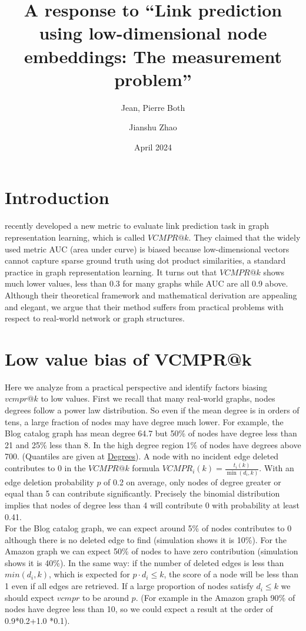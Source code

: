 \documentclass{article}
\title{A response to “Link prediction using low-dimensional node embeddings:
The measurement problem”}
\author[1,*]{Jean, Pierre Both}
\author[2]{Jianshu Zhao}
\affil[1]{Université Paris-Saclay, CEA, List, Palaiseau, France. (Retired)}
\affil[2]{Center for Bioinformatics and Computational Genomics, Georgia Institute of Technology, Atlanta, Georgia, USA}
\affil[*]{Corresponding author : jeanpierre.both@gmail.com}
\date{April 2024}
\begin{document}
\maketitle

\section{Introduction}

\citet{Menand} recently developed a new metric to evaluate link prediction task in graph representation learning, which is called $VCMPR@k$.
They claimed that the widely used metric AUC (area under curve) is biased because low-dimensional vectors cannot capture sparse ground truth using dot product similarities, a standard practice in graph representation learning.
It turns out that $VCMPR@k$ shows much lower values, less than 0.3 for many graphs while AUC are all 0.9 above. Although their theoretical framework and mathematical derivation are appealing and elegant, we argue that their method suffers from practical problems with respect to real-world network or graph structures.


\section{Low value bias of VCMPR@k}

Here we analyze from a practical perspective and identify factors biasing $vcmpr@k$ to low values.
First we recall that many real-world graphs, nodes degrees follow a power law distribution.
So even if the mean degree is in orders of tens, a large fraction of nodes may have degree much lower.
For example, the Blog catalog graph has mean degree 64.7 but 50\% of nodes have degree less than 21 and 25\% less than 8. In the high degree region 1\% of nodes have degrees above 700. (Quantiles are given at  \href{https://github.com/jean-pierreBoth/linkauc/tree/master/Degrees}{\color{blue}Degrees}).
A node with no incident edge deleted contributes to 0 in the $VCMPR@k$ formula $ VCMPR_{i}(k)= \frac{t_{i}(k)}{\min(d_{i},k)}$. With an edge deletion probability $p$ of 0.2 on average, only nodes of degree greater or equal than 5 can contribute significantly. Precisely the binomial distribution implies that nodes of degree less than 4 will contribute 0 with probability at least 0.41. \\
For the Blog catalog graph, we can expect around 5\% of nodes contributes to 0 although there is no deleted edge to find (simulation shows it is 10\%).
For the Amazon graph we can expect 50\% of nodes to have zero contribution (simulation shows it is 40\%).
In the same way: if the number of deleted edges is less than $min(d_{i},k)$, which is expected for $p \cdot d_{i} \leq k$, the score of a node will be less than 1 even if all edges are retrieved.
If a large proportion of nodes satisfy $d_{i} \le k$ we should expect $vcmpr$ to be around $p$. (For example in the Amazon graph 90\% of nodes have degree less than 10, so we could expect a result at the order of 0.9*0.2+1.0 *0.1).\\
\end{document}
